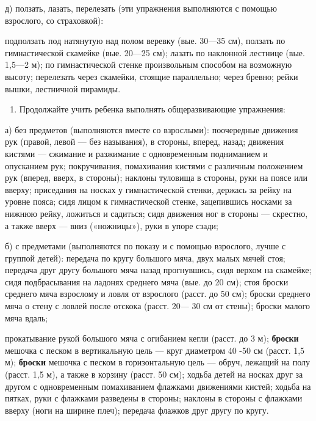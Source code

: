 \documentclass[a5paper]{book}
\begin{document}
д) ползать, лазать, перелезать (эти упражнения выполняются с помощью
взрослого, со страховкой):

подползать под натянутую над полом веревку (вые. 30---35 см), ползать по
гимнастической скамейке (вые. 20---25 см); лазать по наклонной лестнице
(вые. 1,5---2 м); по гимнастической стенке произвольным способом на
возможную высоту; перелезать через скамейки, стоящие параллельно; через
бревно; рейки вышки, лестничной пирамиды.


\begin{enumerate}
\def\labelenumi{\arabic{enumi}.}
\setcounter{enumi}{2}
\item
  
  Продолжайте учить ребенка выполнять общеразвивающие упражнения:
  
\end{enumerate}


а) без предметов (выполняются вместе со взрослыми): поочередные движения
рук (правой, левой --- без называния), в стороны, вперед, назад;
движения кистями --- сжимание и разжимание с одновременным подниманием и
опусканием рук; покручивания, помахивания кистями с различным положением
рук (вперед, вверх, в стороны); наклоны туловища в стороны, руки на
поясе или вверху; приседания на носках у гимнастической стенки, держась
за рейку на уровне пояса; сидя лицом к гимнастической стенке,
зацепившись носками за нижнюю рейку, ложиться и садиться; сидя движения
ног в стороны --- скрестно, а также вверх --- вниз («ножницы»), руки в
упоре сзади;

б) с предметами (выполняются по показу и с помощью взрослого, лучше с
группой детей): передача по кругу большого мяча, двух малых мячей стоя;
передача друг другу большого мяча назад прогнувшись, сидя верхом на
скамейке; сидя подбрасывания на ладонях среднего мяча (вые. до 20 см);
стоя броски среднего мяча взрослому и ловля от взрослого (расст. до 50
см); броски среднего мяча о стену с ловлей после отскока (расст. 20---
30 см от стены); броски малого мяча вдаль;

прокатывание рукой большого мяча с огибанием кегли (расст. до 3 м);
\textbf{броски} мешочка с песком в вертикальную цель --- круг диаметром
40 -50 см (расст. 1,5 м); \textbf{броски} мешочка с песком в
горизонтальную цель --- обруч, лежащий на полу (расст. 1,5 м), а также в
корзину (расст. 50 см); ходьба детей на носках друг за другом с
одновременным помахиванием флажками движениями кистей; ходьба на пятках,
руки с флажками разведены в стороны; наклоны в стороны с флажками вверху
(ноги на ширине плеч); передача флажков друг другу по кругу.
\end{document}
